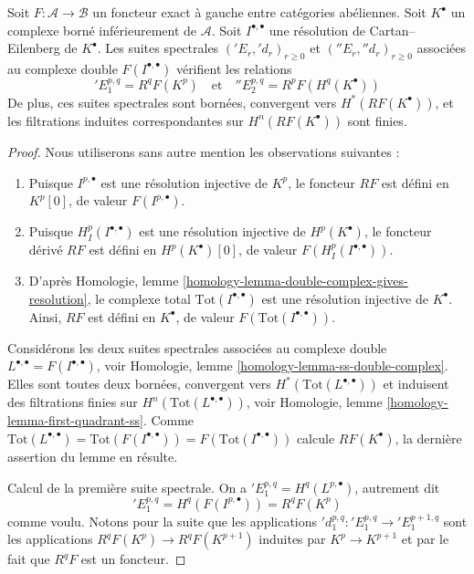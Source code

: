 \begin{lemma}
\label{lemma-two-ss-complex-functor}
Soit $F : \mathcal{A} \to \mathcal{B}$ un foncteur exact à gauche entre
catégories abéliennes.
Soit $K^\bullet$ un complexe borné inférieurement de $\mathcal{A}$.
Soit $I^{\bullet, \bullet}$ une résolution de Cartan--Eilenberg de
$K^\bullet$. Les suites spectrales
$({}'E_r, {}'d_r)_{r \geq 0}$ et $({}''E_r, {}''d_r)_{r \geq 0}$ associées au
complexe double $F(I^{\bullet, \bullet})$ vérifient les relations
$$
{}'E_1^{p, q} = R^qF(K^p)
\quad
\text{et}
\quad
{}''E_2^{p, q} = R^pF(H^q(K^\bullet))
$$
De plus, ces suites spectrales sont bornées, convergent vers
$H^*(RF(K^\bullet))$, et les filtrations induites correspondantes sur
$H^n(RF(K^\bullet))$ sont finies.
\end{lemma}

\begin{proof}
Nous utiliserons sans autre mention les observations suivantes :
\begin{enumerate}
\item Puisque $I^{p, \bullet}$ est une résolution injective de $K^p$, le
foncteur $RF$ est défini en $K^p[0]$, de valeur $F(I^{p, \bullet})$.
\item Puisque $H^p_I(I^{\bullet, \bullet})$ est une résolution injective de
$H^p(K^\bullet)$, le foncteur dérivé $RF$ est défini en
$H^p(K^\bullet)[0]$, de valeur $F(H^p_I(I^{\bullet, \bullet}))$.
\item D'après Homologie, lemme
\ref{homology-lemma-double-complex-gives-resolution}, le complexe total
$\text{Tot}(I^{\bullet, \bullet})$ est une résolution injective de
$K^\bullet$. Ainsi, $RF$ est défini en $K^\bullet$, de valeur
$F(\text{Tot}(I^{\bullet, \bullet}))$.
\end{enumerate}
Considérons les deux suites spectrales associées au complexe double
$L^{\bullet, \bullet} = F(I^{\bullet, \bullet})$, voir Homologie, lemme
\ref{homology-lemma-ss-double-complex}.
Elles sont toutes deux bornées, convergent vers
$H^*(\text{Tot}(L^{\bullet, \bullet}))$ et induisent des filtrations finies sur
$H^n(\text{Tot}(L^{\bullet, \bullet}))$, voir Homologie, lemme
\ref{homology-lemma-first-quadrant-ss}.
Comme
$\text{Tot}(L^{\bullet, \bullet}) =
\text{Tot}(F(I^{\bullet, \bullet})) =
F(\text{Tot}(I^{\bullet, \bullet}))$ calcule $RF(K^\bullet)$, la dernière
assertion du lemme en résulte.

\medskip\noindent
Calcul de la première suite spectrale. On a
${}'E_1^{p, q} = H^q(L^{p, \bullet})$, autrement dit
$$
{}'E_1^{p, q} = H^q(F(I^{p, \bullet})) = R^qF(K^p)
$$
comme voulu. Notons pour la suite que les applications
${}'d_1^{p, q} : {}'E_1^{p, q} \to {}'E_1^{p + 1, q}$ sont les applications
$R^qF(K^p) \to R^qF(K^{p + 1})$ induites par $K^p \to K^{p + 1}$ et par le
fait que $R^qF$ est un foncteur.


\end{proof}
